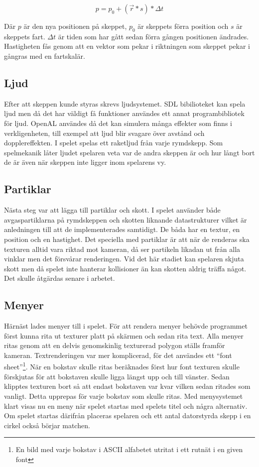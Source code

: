\documentclass[12pt, a4paper]{article}
\begin{document}
	\begin{equation}
		p = p_0 + (\vec{r} * s) * \Delta t
	\end{equation}
	
	Där $p$ är den nya positionen på skeppet, $p_0$ är skeppets förra position och $s$ är skeppets fart. $\Delta t$ är tiden som har gått sedan förra gången positionen ändrades. Hastigheten fås genom att en vektor som pekar i riktningen som skeppet pekar i gångras med en fartskalär. 
	
	\subsection{Ljud}
	Efter att skeppen kunde styras skrevs ljudsystemet. SDL bibilioteket kan spela ljud men då det har väldigt få funktioner användes ett annat programbibliotek för ljud. OpenAL användes då det kan simulera många effekter som finns i verkligenheten, till exempel att ljud blir svagare över avstånd och dopplereffekten. I spelet spelas ett raketljud från varje rymdskepp. Som spelmekanik låter ljudet spelaren veta var de andra skeppen är och hur långt bort de är även när skeppen inte ligger inom spelarens vy. 
	
	\subsection{Partiklar}
	Nästa steg var att lägga till partiklar och skott. I spelet använder både avgaspartiklarna på rymdskeppen och skotten liknande datastrukturer vilket är anledningen till att de implementerades samtidigt. De båda har en textur, en position och en hastighet. Det speciella med partiklar är att när de renderas ska texturen alltid vara riktad mot kameran, då ser partikeln likadan ut från alla vinklar men det försvårar renderingen. Vid det här stadiet kan spelaren skjuta skott men då spelet inte hanterar kollisioner än kan skotten aldrig träffa något. Det skulle åtgärdas senare i arbetet. 
	
	\subsection{Menyer}
	Härnäst lades menyer till i spelet. För att rendera menyer behövde programmet först kunna rita ut texturer platt på skärmen och sedan rita text. Alla menyer ritas genom att en delvis genomskinlig texturerad polygon ställs framför kameran. Textrenderingen var mer komplicerad, för det användes ett ``font sheet''\footnote{En bild med varje bokstav i ASCII alfabetet utritat i ett rutnät i en given font}. När en bokstav skulle ritas beräknades först hur font texturen skulle förskjutas för att bokstaven skulle ligga längst upp och till vänster. Sedan klipptes texturen bort så att endast bokstaven var kvar vilken sedan ritades som vanligt. Detta upprepas för varje bokstav som skulle ritas. Med menysystemet klart visas nu en meny när spelet startas med spelets titel och några alternativ. Om spelet startas därifrån placeras spelaren och ett antal datorstyrda skepp i en cirkel också börjar matchen. 
	
\end{document}

